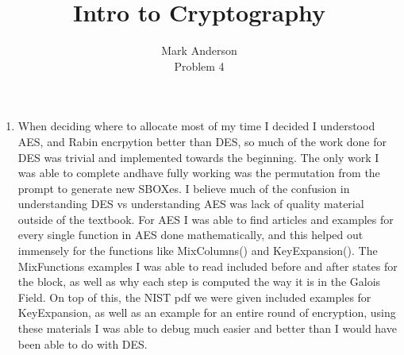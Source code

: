 \documentclass[12pt]{article}
\begin{document}
 
\title{Intro to Cryptography} 
\author{Mark Anderson\\ 
Problem 4} 
 
\maketitle
\begin{enumerate}
  \item When deciding where to allocate most of my time I decided I understood AES, and Rabin encrpytion better than DES, so much of the work done for DES was trivial and implemented towards the beginning.  The only work I was able to complete andhave fully working was the permutation from the prompt to generate new SBOXes.  I believe much of the confusion in understanding DES vs understanding AES was lack of quality material outside of the textbook.  For AES I was able to find articles and examples for every single function in AES done mathematically, and this helped out immensely for the functions like MixColumns() and KeyExpansion().  The MixFunctions examples I was able to read included before and after states for the block, as well as why each step is computed the way it is in the Galois Field.  On top of this, the NIST pdf we were given included examples for KeyExpansion, as well as an example for an entire round of encryption, using these materials I was able to debug much easier and better than I would have been able to do with DES. 
\end{enumerate}
\end{document}

